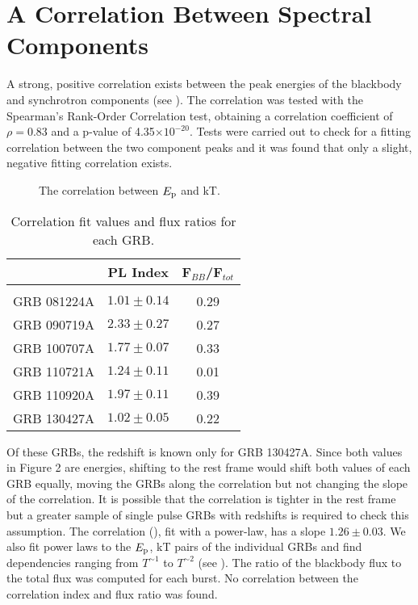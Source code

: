\section{A Correlation Between Spectral Components}
A strong, positive correlation exists between the peak energies of the
blackbody and synchrotron components (see ). The correlation
was tested with the Spearman's Rank-Order Correlation test, obtaining
a correlation coefficient of $\rho=0.83$ and a p-value of 4.35$\times
10^{-20}$. Tests were carried out to check for a fitting correlation
between the two component peaks and it was found that only a slight,
negative fitting correlation exists.


\begin{figure}[t]
  \centering
  \caption{The correlation between $E_{\rm p}$ and kT.}
  \label{fig:epktcor}
\end{figure}

\begin{table}[t]

\centering
\begin{tabular}{l || c | c }
 
  &            PL Index  &    F$_{BB}$/F$_{tot}$\\
\hline\hline\\
  GRB 081224A  &	$1.01   \pm	0.14	 $ &      0.29\\
  GRB 090719A   &	$2.33   \pm	0.27	 $ &      0.27\\
  GRB 100707A  &	$1.77	\pm	0.07	 $ &      0.33\\
  GRB 110721A &	$1.24	\pm	0.11	 $ &      0.01\\
  GRB 110920A                    &	$1.97	\pm	0.11	 $ &      0.39\\
  GRB 130427A & 	$1.02	\pm	0.05	 $ &	  0.22\\
  


\end{tabular}
\caption{Correlation fit values and flux ratios for each GRB.}
\label{tab:epktcor}
\end{table}

Of these GRBs, the redshift is known only for GRB 130427A. Since both
values in Figure 2 are energies, shifting to the rest frame would
shift both values of each GRB equally, moving the GRBs along the
correlation but not changing the slope of the correlation. It is
possible that the correlation is tighter in the rest frame but a
greater sample of single pulse GRBs with redshifts is required to
check this assumption. The correlation (), fit
with a power-law, has a slope $1.26\pm0.03$. We also fit power laws to
the $E_{\rm p}$, kT pairs of the individual GRBs and find dependencies
ranging from $T^{\sim 1}$ to $T^{\sim 2}$ (see
). The ratio of the blackbody flux to the total
flux was computed for each burst. No correlation between the
correlation index and flux ratio was found.

